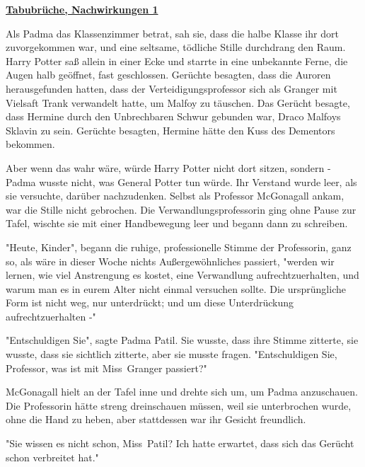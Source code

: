 

\hypertarget{tabubruxfcche-nachwirkungen-1}{%

\textbf{\uline{Tabubrüche, Nachwirkungen 1}}

Als Padma das Klassenzimmer betrat, sah sie, dass die halbe Klasse ihr dort zuvorgekommen war, und eine seltsame, tödliche Stille durchdrang den Raum. Harry Potter saß allein in einer Ecke und starrte in eine unbekannte Ferne, die Augen halb geöffnet, fast geschlossen. Gerüchte besagten, dass die Auroren herausgefunden hatten, dass der Verteidigungsprofessor sich als Granger mit Vielsaft Trank verwandelt hatte, um Malfoy zu täuschen. Das Gerücht besagte, dass Hermine durch den Unbrechbaren Schwur gebunden war, Draco Malfoys Sklavin zu sein. Gerüchte besagten, Hermine hätte den Kuss des Dementors bekommen.

Aber wenn das wahr wäre, würde Harry Potter nicht dort sitzen, sondern - Padma wusste nicht, was General Potter tun würde. Ihr Verstand wurde leer, als sie versuchte, darüber nachzudenken. Selbst als Professor McGonagall ankam, war die Stille nicht gebrochen. Die Verwandlungsprofessorin ging ohne Pause zur Tafel, wischte sie mit einer Handbewegung leer und begann dann zu schreiben.

"Heute, Kinder", begann die ruhige, professionelle Stimme der Professorin, ganz so, als wäre in dieser Woche nichts Außergewöhnliches passiert, "werden wir lernen, wie viel Anstrengung es kostet, eine Verwandlung aufrechtzuerhalten, und warum man es in eurem Alter nicht einmal versuchen sollte. Die ursprüngliche Form ist nicht weg, nur unterdrückt; und um diese Unterdrückung aufrechtzuerhalten -"

"Entschuldigen Sie", sagte Padma Patil. Sie wusste, dass ihre Stimme zitterte, sie wusste, dass sie sichtlich zitterte, aber sie musste fragen. "Entschuldigen Sie, Professor, was ist mit Miss~Granger passiert?"

McGonagall hielt an der Tafel inne und drehte sich um, um Padma anzuschauen. Die Professorin hätte streng dreinschauen müssen, weil sie unterbrochen wurde, ohne die Hand zu heben, aber stattdessen war ihr Gesicht freundlich.

"Sie wissen es nicht schon, Miss~Patil? Ich hatte erwartet, dass sich das Gerücht schon verbreitet hat."

}

